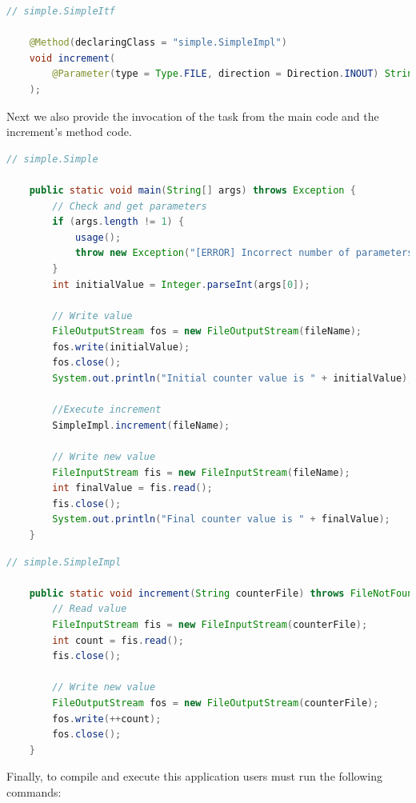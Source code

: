\begin{lstlisting}[language=java]
	// simple.SimpleItf
	
	@Method(declaringClass = "simple.SimpleImpl")
	void increment(
		@Parameter(type = Type.FILE, direction = Direction.INOUT) String file
	);
\end{lstlisting}

Next we also provide the invocation of the task from the main code and the increment's method code.

\begin{lstlisting}[language=java]
	// simple.Simple
	
	public static void main(String[] args) throws Exception {
		// Check and get parameters
		if (args.length != 1) {
			usage();
			throw new Exception("[ERROR] Incorrect number of parameters");
		}
		int initialValue = Integer.parseInt(args[0]);

		// Write value
		FileOutputStream fos = new FileOutputStream(fileName);
		fos.write(initialValue);
		fos.close();
		System.out.println("Initial counter value is " + initialValue);

		//Execute increment
		SimpleImpl.increment(fileName);

		// Write new value
		FileInputStream fis = new FileInputStream(fileName);
		int finalValue = fis.read();
		fis.close();
		System.out.println("Final counter value is " + finalValue);
	}
\end{lstlisting}

\begin{lstlisting}[language=java]
	// simple.SimpleImpl
	
	public static void increment(String counterFile) throws FileNotFoundException, IOException {
		// Read value
		FileInputStream fis = new FileInputStream(counterFile);
		int count = fis.read();
		fis.close();
		
		// Write new value
		FileOutputStream fos = new FileOutputStream(counterFile);
		fos.write(++count);
		fos.close();
	}
\end{lstlisting}

Finally, to compile and execute this application users must run the following commands:

